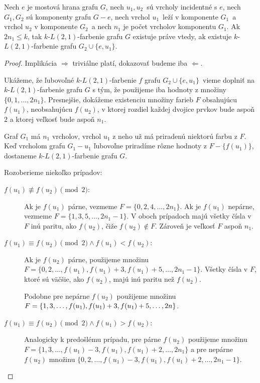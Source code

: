 \begin{lema}
    \label{pseudoblok-prune}
    Nech $e$ je mostová hrana grafu $G$, nech $u_1, u_2$ sú vrcholy incidentné s $e$,
    nech $G_1, G_2$ sú komponenty grafu $G - e$, nech vrchol $u_1$ leží v komponente $G_1$ a vrchol $u_2$
    v komponente $G_2$ a
    nech $n_1$ je počet vrcholov komponentu $G_1$. Ak $2n_1 \leq k$, tak $k$-$L(2,1)$-farbenie
    grafu $G$ existuje práve vtedy, ak existuje $k$-$L(2,1)$-farbenie grafu $G_2 \cup \{e, u_1\}$.
\end{lema}

\begin{proof}
    Implikácia $\boxed{\Rightarrow}$ triviálne platí, dokazovať budeme iba $\boxed{\Leftarrow}$.

    Ukážeme, že ľubovoľné $k$-$L(2,1)$-farbenie $f$ grafu $G_2 \cup \{e, u_1\}$ vieme doplniť na
    $k$-$L(2,1)$-farbenie grafu $G$ s tým, že použijeme iba hodnoty z množiny $\{0, 1, \ldots, 2n_1\}$.
    Presnejšie, dokážeme existenciu množiny farieb $F$ obsahujúcu $f(u_1)$, neobsahujúcu $f(u_2)$,
    v ktorej rozdiel každej dvojice prvkov bude aspoň $2$ a ktorej veľkosť bude aspoň $n_1$.
    
    Graf $G_1$ má $n_1$ vrcholov, vrchol $u_1$ z neho už má priradenú niektorú farbu z $F$. Keď vrcholom
    grafu $G_1 - u_1$ ľubovoľne priradíme rôzne hodnoty z $F - \{f(u_1)\}$, dostaneme $k$-$L(2,1)$-farbenie
    grafu $G$.

    Rozoberieme niekoľko prípadov:

    \begin{description}
        \item[$\boxed{f(u_1) \not\equiv f(u_2) \pmod{2}}:$] 
            Ak je $f(u_1)$ párne, vezmeme $F = \{0, 2, 4, \ldots, 2n_1\}$.
            Ak je $f(u_1)$ nepárne, vezmeme $F = \{1, 3, 5, \ldots, 2n_1 - 1\}$. V oboch prípadoch majú všetky
            čísla v $F$ inú paritu, ako $f(u_2)$, čiže $f(u_2) \notin F$. Zároveň je veľkosť $F$ aspoň $n_1$.

        \item[$\boxed{f(u_1) \equiv f(u_2) \pmod{2} \wedge f(u_1) < f(u_2)}:$]
            Ak je $f(u_2)$ párne, použijeme množinu
            $F = \{0, 2, \ldots, f(u_1), f(u_1) + 3, f(u_1) + 5, \ldots, 2n_1 - 1\}$. Všetky čísla v $F$, ktoré sú
            väčšie, ako $f(u_2)$, majú inú paritu než $f(u_2)$.

            Podobne pre nepárne $f(u_2)$ použijeme množinu $F = \{1, 3, \ldots, f(u_1), f(u_1) + 3, \\ f(u_1) + 5, \ldots, 2n\}$.

        \item[$\boxed{f(u_1) \equiv f(u_2) \pmod{2} \wedge f(u_1) > f(u_2)}:$]
            Analogicky k predošlému prípadu, pre párne $f(u_2)$ použijeme množinu $F = \{1, 3, \ldots, f(u_1) - 3, f(u_1), f(u_1) + 2, \ldots, 2n_1\}$
            a pre nepárne $f(u_2)$ množinu $\{0, 2, \ldots, f(u_1) - 3, f(u_1), f(u_1) + 2, \ldots, 2n_1 - 1\}$. \qedhere
    \end{description}
\end{proof}


